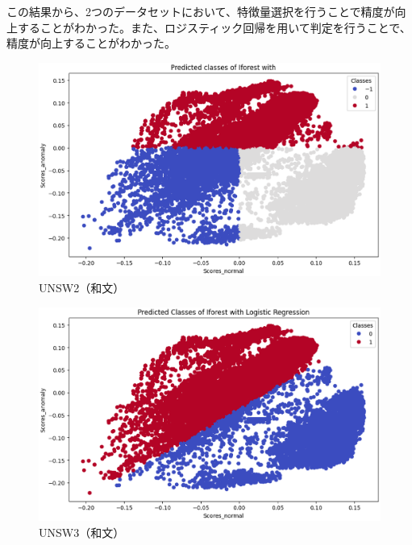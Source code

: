 \documentclass{css}
\begin{document}
この結果から、2つのデータセットにおいて、特徴量選択を行うことで精度が向上することがわかった。また、ロジスティック回帰を用いて判定を行うことで、精度が向上することがわかった。



\begin{figure}[tb]
    \centering
    \includegraphics[width=\linewidth]{pictures/eps/UNSW2.eps}
    \caption{UNSW2（和文）}
    \label{fig:UNSW2}
\end{figure}


\begin{figure}[tb]
    \centering
    \includegraphics[width=\linewidth]{pictures/eps/UNSW3.eps}
    \caption{UNSW3（和文）}
    \label{fig:UNSW3}
\end{figure}
\end{document}
